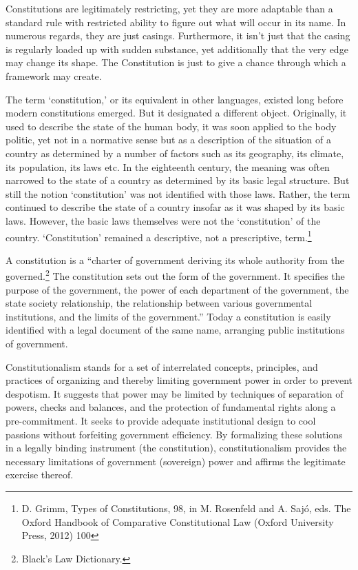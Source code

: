 \begin{multicols}{2}
\noi
Constitutions are legitimately restricting, yet they are more adaptable than a standard rule
with restricted ability to figure out what will occur in its name. In numerous regards, they are
just casings. Furthermore, it isn't just that the casing is regularly loaded up with sudden
substance, yet additionally that the very edge may change its shape. The Constitution is just
to give a chance through which a framework may create.


\noi
The term ‘constitution,’ or its equivalent in other languages, existed long before modern
constitutions emerged. But it designated a different object. Originally, it used to describe the
state of the human body, it was soon applied to the body politic, yet not in a normative sense
but as a description of the situation of a country as determined by a number of factors such as
its geography, its climate, its population, its laws etc. In the eighteenth century, the meaning
was often narrowed to the state of a country as determined by its basic legal structure. But
still the notion ‘constitution’ was not identified with those laws. Rather, the term continued to
describe the state of a country insofar as it was shaped by its basic laws. However, the basic
laws themselves were not the ‘constitution’ of the country. ‘Constitution’ remained a
descriptive, not a prescriptive, term.\footnote{D. Grimm, Types of Constitutions, 98, in M. Rosenfeld and A. Sajó, eds. The Oxford Handbook of Comparative Constitutional Law (Oxford University Press, 2012) 100}

\noi
A constitution is a “charter of government deriving its whole authority from the governed.\footnote{Black’s Law Dictionary.} The constitution sets out the form of the government. It specifies the purpose of the
government, the power of each department of the government, the state society relationship,
the relationship between various governmental institutions, and the limits of the
government.” Today a constitution is easily identified with a legal document of the same
name, arranging public institutions of government.

\vspace{-.1cm}

\noi
Constitutionalism stands for a set of interrelated concepts, principles, and practices of
organizing and thereby limiting government power in order to prevent despotism. It suggests
that power may be limited by techniques of separation of powers, checks and balances, and
the protection of fundamental rights along a pre-commitment. It seeks to provide adequate
institutional design to cool passions without forfeiting government efficiency. By formalizing
these solutions in a legally binding instrument (the constitution), constitutionalism provides
the necessary limitations of government (sovereign) power and affirms the legitimate
exercise thereof.


\end{multicols}
